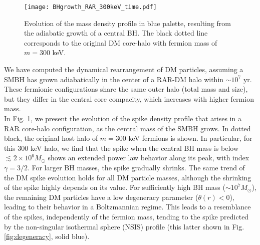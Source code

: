 \documentclass[baaa]{baaa}
\begin{document}
\begin{figure}[t]
    \centering
    \texttt{[image: BHgrowth\_RAR\_300keV\_time.pdf]}
    \caption{Evolution of the mass density profile in blue palette, resulting from the adiabatic growth of a central BH. The black dotted line corresponds to the original DM core-halo with fermion mass of $m=300$ keV.}
    \label{fig:RAR-BHs}
\end{figure}
%
We have computed the dynamical rearrangement of DM particles, assuming a SMBH has grown adiabatically in the center of a RAR-DM halo within $\sim 10^7$ yr. These fermionic configurations share the same outer halo (total mass and size), but they differ in the central core compacity, which increases with higher fermion mass. \\
In Fig. \ref{fig:RAR-BHs}, we present the evolution of the spike density profile that arises in a RAR core-halo configuration, as the central mass of the SMBH grows. In dotted black, the original host halo of $m=300$ keV fermions is shown. 
In particular, for this 300 keV halo, we find that the spike when the central BH mass is below $\lesssim 2\times 10^6 M_\odot$ shows an extended power law behavior along its peak, with index $\gamma = 3/2$. For larger BH masses, the spike gradually shrinks.
The same trend of the DM spike evolution holds for all DM particle masses, although the shrinking of the spike highly depends on its value. 
For sufficiently high BH mass ($\sim 10^7M_\odot$), the remaining DM particles have a low degeneracy parameter ($\theta(r)<0$), leading to their behavior in a Boltzmannian regime. This leads to a resemblance of the spikes, independently of the fermion mass,
tending to the spike predicted by the non-singular isothermal sphere (NSIS) profile (this latter shown in Fig. \ref{fig:degeneracy}, solid blue).
\end{document}
